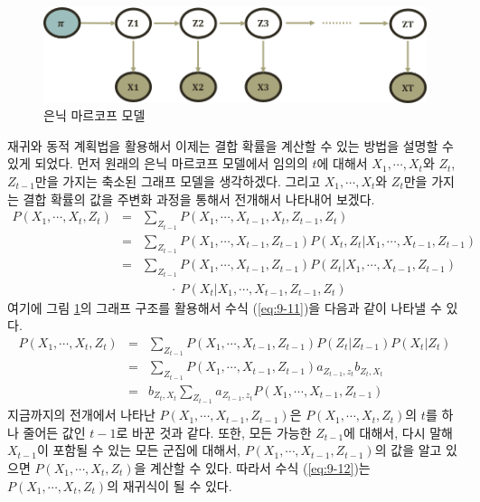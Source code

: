 \documentclass[a4paper]{oblivoir}
\begin{document}
\begin{figure}[ht] \centering 
\includegraphics[scale=0.7]{fig9_6.png} 
\caption{은닉 마르코프 모델}
\label{fig:9-13}
\end{figure}

재귀와 동적 계획법을 활용해서 이제는 결합 확률을 계산할 수 있는 방법을 설명할 수 있게 되었다. 먼저 원래의 은닉 마르코프 모델에서 임의의  $t$에 대해서 $X_{1},\cdots,X_{t}$와 $Z_{t}$, $Z_{t-1}$만을 가지는 축소된 그래프 모델을 생각하겠다. 그리고 $X_{1},\cdots,X_{t}$와 $Z_{t}$만을 가지는 결합 확률의 값을 주변화 과정을 통해서 전개해서 나타내어 보겠다. 
\begin{eqnarray}
P(X_{1},\cdots,X_{t},Z_{t}) & = & \sum_{Z_{t-1}} P(X_{1},\cdots,X_{t-1},X_{t},Z_{t-1},Z_{t}) \nonumber \\
& = & \sum_{Z_{t-1}} P(X_{1},\cdots,X_{t-1},Z_{t-1}) P(X_{t},Z_{t}|X_{1},\cdots,X_{t-1},Z_{t-1})  \nonumber \\
& = & \sum_{Z_{t-1}} P(X_{1},\cdots,X_{t-1},Z_{t-1}) P(Z_{t}|X_{1},\cdots,X_{t-1},Z_{t-1}) \nonumber \\ 
&  &  \ \ \ \ \ \ \ \ \ \ \cdot \ P(X_{t} | X_{1},\cdots,X_{t-1},Z_{t-1},Z_{t})  \label{eq:9-11}
\end{eqnarray}
여기에 그림 \ref{fig:9-13}의 그래프 구조를 활용해서 수식 (\ref{eq:9-11})을 다음과 같이 나타낼 수 있다. 
\begin{eqnarray}
P(X_{1},\cdots,X_{t},Z_{t}) & = & \sum_{Z_{t-1}} P(X_{1},\cdots,X_{t-1},Z_{t-1}) P(Z_{t}|Z_{t-1}) P(X_{t} | Z_{t}) \nonumber \\ 
& = & \sum_{Z_{t-1}} P(X_{1},\cdots,X_{t-1},Z_{t-1}) a_{Z_{t-1},z_{t}} b_{Z_{t},X_{t}} \nonumber \\
& = & b_{Z_{t},X_{t}} \sum_{Z_{t-1}} a_{Z_{t-1},z_{t}} P(X_{1},\cdots,X_{t-1},Z_{t-1}) \label{eq:9-12}
\end{eqnarray}
지금까지의 전개에서 나타난 $P(X_{1},\cdots,X_{t-1},Z_{t-1})$은 $P(X_{1},\cdots,X_{t},Z_{t})$의 $t$를 하나 줄어든 값인 $t-1$로 바꾼 것과 같다. 또한, 모든 가능한 $Z_{t-1}$에 대해서, 다시 말해 $X_{t-1}$이 포함될 수 있는 모든 군집에 대해서, $P(X_{1},\cdots,X_{t-1},Z_{t-1})$의 값을 알고 있으면 $P(X_{1},\cdots,X_{t},Z_{t})$을 계산할 수 있다. 따라서 수식 (\ref{eq:9-12})는 $P(X_{1},\cdots,X_{t},Z_{t})$의 재귀식이 될 수 있다. \\
\end{document}
